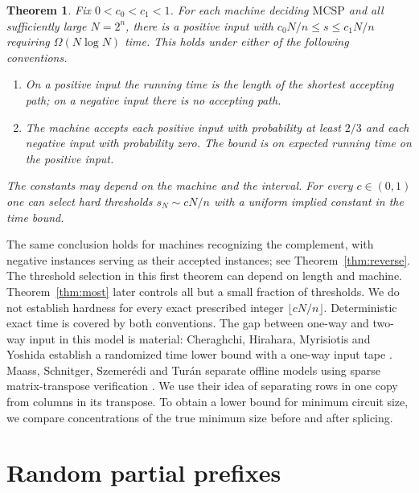 \documentclass[11pt]{article}
\newtheorem{theorem}{Theorem}
\newcommand{\MC}{\mathrm{MCSP}}
\begin{document}
\begin{theorem}\label{thm:main}
Fix $0<c_0<c_1<1$. For each machine deciding $\MC$ and all sufficiently large $N=2^n$, there is a positive input with $c_0N/n\le s\le c_1N/n$ requiring $\Omega(N\log N)$ time. This holds under either of the following conventions.
\begin{enumerate}
\item On a positive input the running time is the length of the shortest accepting path; on a negative input there is no accepting path.
\item The machine accepts each positive input with probability at least $2/3$ and each negative input with probability zero. The bound is on expected running time on the positive input.
\end{enumerate}
The constants may depend on the machine and the interval. For every $c\in(0,1)$ one can select hard thresholds $s_N\sim cN/n$ with a uniform implied constant in the time bound.
\end{theorem}

The same conclusion holds for machines recognizing the complement, with negative instances serving as their accepted instances; see Theorem~\ref{thm:reverse}. The threshold selection in this first theorem can depend on length and machine. Theorem~\ref{thm:most} later controls all but a small fraction of thresholds. We do not establish hardness for every exact prescribed integer $\lfloor cN/n\rfloor$. Deterministic exact time is covered by both conventions. The gap between one-way and two-way input in this model is material: Cheraghchi, Hirahara, Myrisiotis and Yoshida establish a randomized time lower bound with a one-way input tape \cite{chmy}. Maass, Schnitger, Szemer\'edi and Tur\'an separate offline models using sparse matrix-transpose verification \cite[Theorem~1.1 and Lemma~3.1]{msst}. We use their idea of separating rows in one copy from columns in its transpose. To obtain a lower bound for minimum circuit size, we compare concentrations of the true minimum size before and after splicing.

\section{Random partial prefixes}
\end{document}
